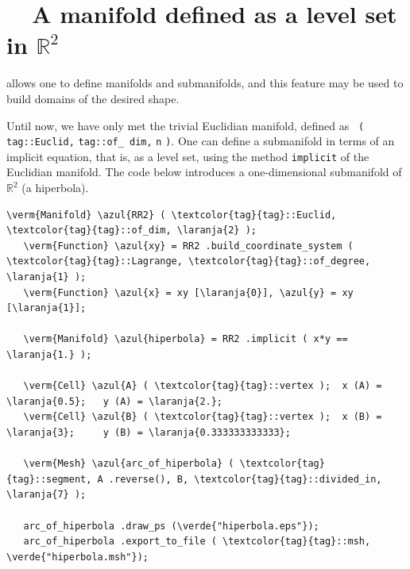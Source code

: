 \section{~~A manifold defined as a level set in $ \mathbb{R}^2 $}
\label{\numb section 2.\numb parag 4}

{\ManiFEM} allows one to define manifolds and submanifolds, and this feature may be
used to build domains of the desired shape.

Until now, we have only met the trivial Euclidian manifold, defined as {\small\tt
{}\break ( \textcolor{tag}{tag}::Euclid,} {\small\tt\textcolor{tag}{tag}::of\_\,dim,}
{\small\tt n} {\small\tt )}.
One can define a submanifold in terms of an implicit equation, that is, as a level set,
using the method {\small\tt implicit} of the Euclidian manifold.
The code below introduces a one-dimensional submanifold of $ \mathbb{R}^2 $ (a hiperbola).

\begin{Verbatim}[commandchars=\\\{\},formatcom=\small\tt,frame=single,
   label=parag-\ref{\numb section 2.\numb parag 4}.cpp,rulecolor=\color{moldura},
   baselinestretch=0.94,framesep=2mm]
   \verm{Manifold} \azul{RR2} ( \textcolor{tag}{tag}::Euclid, \textcolor{tag}{tag}::of_dim, \laranja{2} );
   \verm{Function} \azul{xy} = RR2 .build_coordinate_system ( \textcolor{tag}{tag}::Lagrange, \textcolor{tag}{tag}::of_degree, \laranja{1} );
   \verm{Function} \azul{x} = xy [\laranja{0}], \azul{y} = xy [\laranja{1}];
   
   \verm{Manifold} \azul{hiperbola} = RR2 .implicit ( x*y == \laranja{1.} );
   
   \verm{Cell} \azul{A} ( \textcolor{tag}{tag}::vertex );  x (A) = \laranja{0.5};   y (A) = \laranja{2.};
   \verm{Cell} \azul{B} ( \textcolor{tag}{tag}::vertex );  x (B) = \laranja{3};     y (B) = \laranja{0.333333333333};

   \verm{Mesh} \azul{arc_of_hiperbola} ( \textcolor{tag}{tag}::segment, A .reverse(), B, \textcolor{tag}{tag}::divided_in, \laranja{7} );

   arc_of_hiperbola .draw_ps (\verde{"hiperbola.eps"});
   arc_of_hiperbola .export_to_file ( \textcolor{tag}{tag}::msh, \verde{"hiperbola.msh"});
\end{Verbatim}

